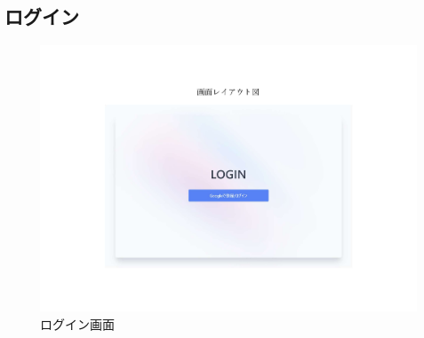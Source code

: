 \documentclass[10pt]{ltjsarticle}
\begin{document}
\subsection{ログイン}
\vspace{-.3cm}
\begin{figure}[H]
    \centering
    \includegraphics[trim=5.2cm 3.4cm 5.2cm 4.6cm, clip, width=13cm]{./img/login_pages.pdf}
    \caption{ログイン画面}
    \label{fig:login1}
\end{figure}
\vspace{-.6cm}
\end{document}
